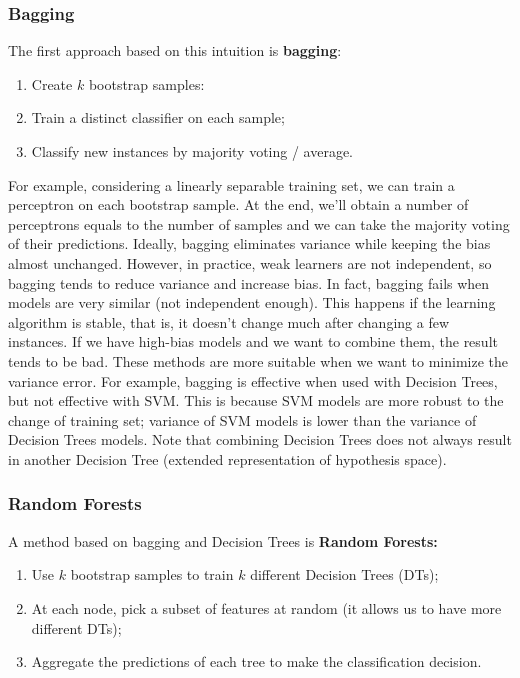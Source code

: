 \subsubsection{Bagging}
The first approach based on this intuition is \textbf{bagging}:
\begin{enumerate}
    \item Create $k$ bootstrap samples:
    \item Train a distinct classifier on each sample;
    \item Classify new instances by majority voting / average.
\end{enumerate}
For example, considering a linearly separable training set, we can train a perceptron on each bootstrap sample. At the end, we'll obtain a number of perceptrons equals to the number of samples and we can take the majority voting of their predictions.\newline\newline
Ideally, bagging eliminates variance while keeping the bias almost unchanged. However, in practice, weak learners are not independent, so bagging tends to reduce variance and increase bias. In fact, bagging fails when models are very similar (not independent enough). This happens if the learning algorithm is stable, that is, it doesn't change much after changing a few instances. If we have high-bias models and we want to combine them, the result tends to be bad. These methods are more suitable when we want to minimize the variance error. For example, bagging is effective when used with Decision Trees, but not effective with SVM. This is because SVM models are more robust to the change of training set; variance of SVM models is lower than the variance of Decision Trees models.\newline\newline
Note that combining Decision Trees does not always result in another Decision Tree (extended representation of hypothesis space).
\subsubsection{Random Forests}
A method based on bagging and Decision Trees is \textbf{Random Forests:}
\begin{enumerate}
    \item Use $k$ bootstrap samples to train $k$ different Decision Trees (DTs);
    \item At each node, pick a subset of features at random (it allows us to have more different DTs);
    \item Aggregate the predictions of each tree to make the classification decision.
\end{enumerate}

